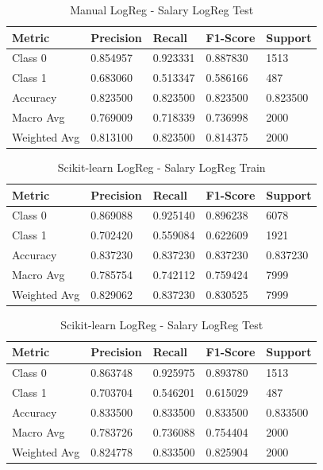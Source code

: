 \documentclass[a4paper,12pt]{article}
\begin{document}
    \begin{table}[h!]
    \centering
    \caption{Manual LogReg - Salary LogReg Test}
    \begin{tabularx}{\textwidth}{|l|X|X|X|X|}
    \hline
    \textbf{Metric} & \textbf{Precision} & \textbf{Recall} & \textbf{F1-Score} & \textbf{Support} \\
    \hline
    Class 0 & 0.854957 & 0.923331 & 0.887830 & 1513 \\
    Class 1 & 0.683060 & 0.513347 & 0.586166 & 487 \\
    Accuracy & 0.823500 & 0.823500 & 0.823500 & 0.823500 \\
    Macro Avg & 0.769009 & 0.718339 & 0.736998 & 2000 \\
    Weighted Avg & 0.813100 & 0.823500 & 0.814375 & 2000 \\
    \hline
    \end{tabularx}
    \end{table}
    
    \begin{table}[h!]
    \centering
    \caption{Scikit-learn LogReg - Salary LogReg Train}
    \begin{tabularx}{\textwidth}{|l|X|X|X|X|}
    \hline
    \textbf{Metric} & \textbf{Precision} & \textbf{Recall} & \textbf{F1-Score} & \textbf{Support} \\
    \hline
    Class 0 & 0.869088 & 0.925140 & 0.896238 & 6078 \\
    Class 1 & 0.702420 & 0.559084 & 0.622609 & 1921 \\
    Accuracy & 0.837230 & 0.837230 & 0.837230 & 0.837230 \\
    Macro Avg & 0.785754 & 0.742112 & 0.759424 & 7999 \\
    Weighted Avg & 0.829062 & 0.837230 & 0.830525 & 7999 \\
    \hline
    \end{tabularx}
    \end{table}
    
    \begin{table}[h!]
    \centering
    \caption{Scikit-learn LogReg - Salary LogReg Test}
    \begin{tabularx}{\textwidth}{|l|X|X|X|X|}
    \hline
    \textbf{Metric} & \textbf{Precision} & \textbf{Recall} & \textbf{F1-Score} & \textbf{Support} \\
    \hline
    Class 0 & 0.863748 & 0.925975 & 0.893780 & 1513 \\
    Class 1 & 0.703704 & 0.546201 & 0.615029 & 487 \\
    Accuracy & 0.833500 & 0.833500 & 0.833500 & 0.833500 \\
    Macro Avg & 0.783726 & 0.736088 & 0.754404 & 2000 \\
    Weighted Avg & 0.824778 & 0.833500 & 0.825904 & 2000 \\
    \hline
    \end{tabularx}
    \end{table}
\newpage
\end{document}
